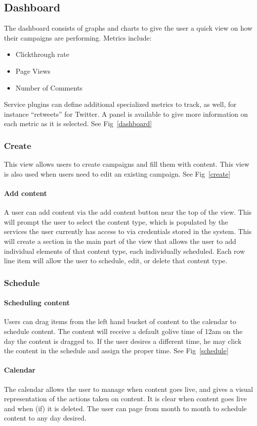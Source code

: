 \documentclass{article}
\begin{document}
\begin{description}
\subsection{Dashboard}
The dashboard consists of graphs and charts to give the user a quick
view on how their campaigns are performing.  Metrics include:
\begin{itemize}
\item Clickthrough rate
\item Page Views
\item Number of Comments
\end{itemize}
Service plugins can define additional specialized metrics to track, as
well, for instance ``retweets'' for Twitter.  A panel is available to
give more information on each metric as it is selected. See Fig~\ref{dashboard}
\subsubsection{Create}
This view allows users to create campaigns and fill them with content.
This view is also used when users need to edit an existing
campaign. See Fig~\ref{create}
\paragraph{Add content}
A user can add content via the add content button near the top of the
view.  This will prompt the user to select the content type, which is
populated by the services the user currently has access to via
credentials stored in the system. This will create a section in the
main part of the view that allows the user to add individual elements
of that content type, each individually scheduled.  Each row line item
will allow the user to schedule, edit, or delete that content type.
\subsubsection{Schedule}
\paragraph{Scheduling content}
Users can drag items from the left hand bucket of content to the
calendar to schedule content.  The content will receive a default
golive time of 12am on the day the content is dragged to.  If the user
desires a different time, he may click the content in the schedule and
assign the proper time. See Fig~\ref{schedule}
\paragraph{Calendar}
The calendar allows the user to manage when content goes live, and
gives a visual representation of the actions taken on content.  It is
clear when content goes live and when (if) it is deleted.  The user
can page from month to month to schedule content to any day desired.

\end{description}
\end{document}
